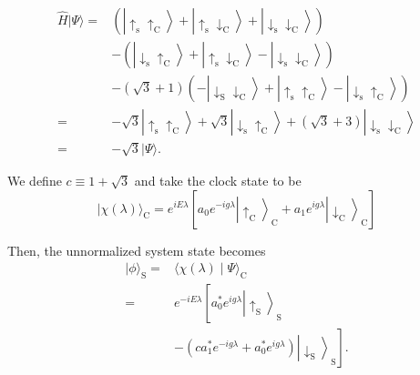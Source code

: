 $$
\begin{aligned}
\hat{H}|\Psi\rangle= & \left(\left|\uparrow_{\mathrm{s}} \uparrow_{\mathrm{C}}\right\rangle+\left|\uparrow_{\mathrm{s}} \downarrow_{\mathrm{C}}\right\rangle+\left|\downarrow_{\mathrm{s}} \downarrow_{\mathrm{C}}\right\rangle\right) \\
& -\left(\left|\downarrow_{\mathrm{s}} \uparrow_{\mathrm{C}}\right\rangle+\left|\uparrow_{\mathrm{s}} \downarrow_{\mathrm{C}}\right\rangle-\left|\downarrow_{\mathrm{s}} \downarrow_{\mathrm{C}}\right\rangle\right) \\
& -(\sqrt{3}+1)\left(-\left|\downarrow_{\mathrm{S}} \downarrow_{\mathrm{C}}\right\rangle+\left|\uparrow_{\mathrm{s}} \uparrow_{\mathrm{C}}\right\rangle-\left|\downarrow_{\mathrm{s}} \uparrow_{\mathrm{C}}\right\rangle\right) \\
= & -\sqrt{3}\left|\uparrow_{\mathrm{s}} \uparrow_{\mathrm{C}}\right\rangle+\sqrt{3}\left|\downarrow_{\mathrm{s}} \uparrow_{\mathrm{C}}\right\rangle+(\sqrt{3}+3)\left|\downarrow_{\mathrm{s}} \downarrow_{\mathrm{C}}\right\rangle \\
= & -\sqrt{3}|\Psi\rangle .
\end{aligned}
$$

We define $c \equiv 1+\sqrt{3}$ and take the clock state to be
$$
|\chi(\lambda)\rangle_{\mathrm{C}}=e^{i E \lambda}\left[a_0 e^{-i g \lambda}\left|\uparrow_{\mathrm{C}}\right\rangle_{\mathrm{C}}+a_1 e^{i g \lambda}\left|\downarrow_{\mathrm{C}}\right\rangle_{\mathrm{C}}\right]
$$

Then, the unnormalized system state becomes
$$
\begin{aligned}
|\phi\rangle_{\mathrm{S}}= & \langle\chi(\lambda) \mid \Psi\rangle_{\mathrm{C}} \\
= & e^{-i E \lambda}\left[a_0^* e^{i g \lambda}\left|\uparrow_{\mathrm{S}}\right\rangle_{\mathrm{S}}\right. \\
& \left.-\left(c a_1^* e^{-i g \lambda}+a_0^* e^{i g \lambda}\right)\left|\downarrow_{\mathrm{S}}\right\rangle_{\mathrm{S}}\right] .
\end{aligned}
$$

